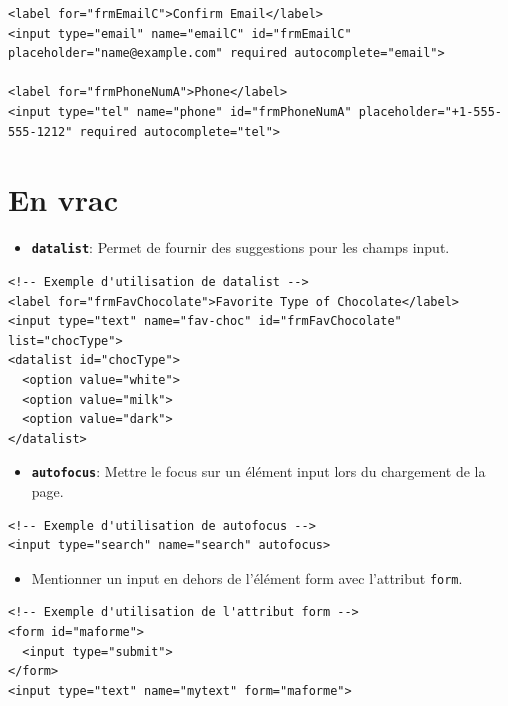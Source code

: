 \documentclass{report}
\begin{document}
\begin{multicols*}{2}
\begin{lstlisting}[style=HTMLDraculaDark]
<label for="frmEmailC">Confirm Email</label>
<input type="email" name="emailC" id="frmEmailC" placeholder="name@example.com" required autocomplete="email">

<label for="frmPhoneNumA">Phone</label>
<input type="tel" name="phone" id="frmPhoneNumA" placeholder="+1-555-555-1212" required autocomplete="tel">
\end{lstlisting}


\section{En vrac}

\begin{itemize}
    \item \textbf{\texttt{datalist}}: Permet de fournir des suggestions pour les champs input.
\end{itemize}

\begin{lstlisting}[style=HTMLDraculaDark]
<!-- Exemple d'utilisation de datalist -->
<label for="frmFavChocolate">Favorite Type of Chocolate</label>
<input type="text" name="fav-choc" id="frmFavChocolate" list="chocType">
<datalist id="chocType">
  <option value="white">
  <option value="milk">
  <option value="dark">
</datalist>
\end{lstlisting}

\begin{itemize}
    \item \textbf{\texttt{autofocus}}: Mettre le focus sur un élément input lors du chargement de la page.
\end{itemize}

\begin{lstlisting}[style=HTMLDraculaDark]
<!-- Exemple d'utilisation de autofocus -->
<input type="search" name="search" autofocus>
\end{lstlisting}

\begin{itemize}
    \item Mentionner un input en dehors de l'élément form avec l'attribut \texttt{form}.
\end{itemize}

\begin{lstlisting}[style=HTMLDraculaDark]
<!-- Exemple d'utilisation de l'attribut form -->
<form id="maforme">
  <input type="submit">
</form>
<input type="text" name="mytext" form="maforme">
\end{lstlisting}




\end{multicols*}
\end{document}
